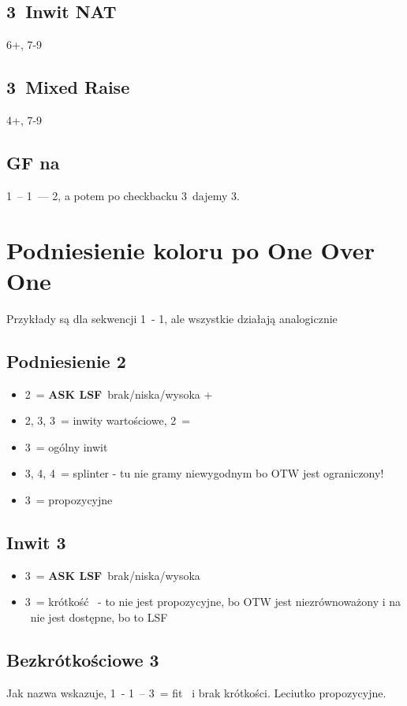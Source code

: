 \documentclass[12pt, a4paper]{article}
\newcommand{\lsf}{\color{WildStrawberry}\textbf{ASK LSF}\color{black}}
\newcommand*\link[1]{\hspace*{0em plus 1fill}\makebox{#1}}
\newcommand{\vimp}{\color{OrangeRed}\link{\textbf{\large{!!}}}\color{black}}
\begin{document}
\subsection*{3\clubs\ Inwit NAT}
6+\clubs, 7-9

\subsection*{3\diams\ Mixed Raise}
4+\diams, 7-9

\subsection*{GF na \diams}
1\diams\ -- 1\spades\ --- 2\nt, a potem po checkbacku 3\clubs\ dajemy 3\diams.


\pagebreak
\section{Podniesienie koloru po One Over One}
Przykłady są dla sekwencji 1\clubs\ - 1\hearts, ale wszystkie działają analogicznie
\subsection*{Podniesienie 2\hearts}
\begin{itemize}
    \item 2\spades\ = \lsf\ brak/niska/wysoka \inv+
    \item 2\nt, 3\clubs, 3\diams\ = inwity wartościowe, 2\nt\ = \spades
    \item 3\hearts\ = ogólny inwit
    \item 3\spades, 4\clubs, 4\diams\ = splinter - tu nie gramy niewygodnym bo OTW jest ograniczony!
    \item 3\nt\ = propozycyjne
\end{itemize}

\subsection*{Inwit 3\hearts}
\begin{itemize}
    \item 3\spades\ = \lsf\ brak/niska/wysoka
    \item 3\nt\ = krótkość \spades\ - to nie jest propozycyjne, bo OTW jest niezrównoważony i na \spades\ nie jest dostępne, bo to LSF
\end{itemize}

\subsection*{Bezkrótkościowe 3\ntx}
Jak nazwa wskazuje, 1\clubs\ - 1\hearts\ -- 3\nt\ = fit \hearts\ i brak krótkości. Leciutko propozycyjne. \vimp
\end{document}
